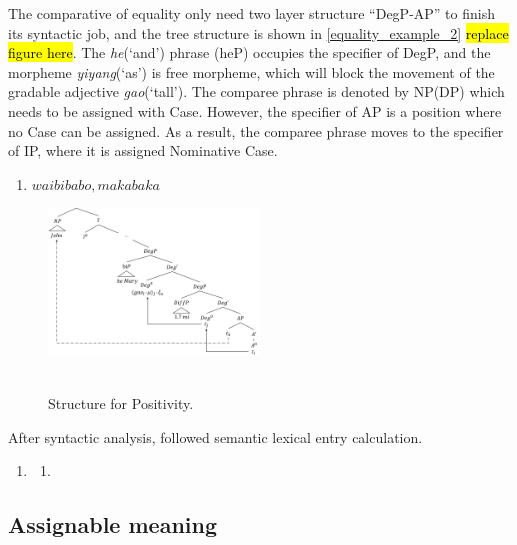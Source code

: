 \documentclass{ctexart}
\begin{document}
The comparative of equality only need two layer structure ``DegP-AP'' to finish its syntactic job, and the tree structure is shown in \ref{equality_example_2} \hl{replace figure here}. The \textit{he}(`and') phrase (heP) occupies the specifier of DegP, and the morpheme \textit{yiyang}(`as') is free morpheme, which will block the movement of the gradable adjective \textit{gao}(`tall'). The comparee phrase is denoted by NP(DP) which needs to be assigned with Case. However, the specifier of AP is a position where no Case can be assigned. As a result, the comparee phrase moves to the specifier of IP, where it is assigned Nominative Case.

\begin{enumerate}
    \item \label{equality_example_2}
    $ wai bi ba bo, ma ka ba ka$
\end{enumerate}

\begin{figure}[H]
    \centering
    \includegraphics[width=0.5\textwidth]{pic/yiyanggao.png}
    \begin{caption}
        \\ \vspace{-1.1ex}
        Structure for Positivity.
    \end{caption}
\end{figure}

After syntactic analysis, followed semantic lexical entry calculation. 

\begin{enumerate}
    \item \label{equality_example_3}
    \begin{enumerate}
        \item \label{equality_example_3_a}
        
    \end{enumerate}
\end{enumerate}


\subsection{Assignable meaning}
\end{document}
